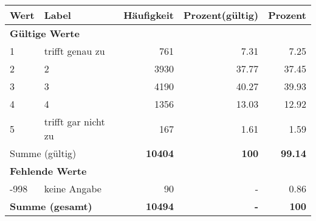      \begin{longtable}{lXrrr}
     \toprule
     \textbf{Wert} & \textbf{Label} & \textbf{Häufigkeit} & \textbf{Prozent(gültig)} & \textbf{Prozent} \\
     \endhead
     \midrule
     \multicolumn{5}{l}{\textbf{Gültige Werte}}\\

     1 &
     \multicolumn{1}{X}{ trifft genau zu   } &


       \num{761} &
       \num[round-mode=places,round-precision=2]{7,31} &
         \num[round-mode=places,round-precision=2]{7,25} \\

     2 &
     \multicolumn{1}{X}{ 2   } &


       \num{3930} &
       \num[round-mode=places,round-precision=2]{37,77} &
         \num[round-mode=places,round-precision=2]{37,45} \\

     3 &
     \multicolumn{1}{X}{ 3   } &


       \num{4190} &
       \num[round-mode=places,round-precision=2]{40,27} &
         \num[round-mode=places,round-precision=2]{39,93} \\

     4 &
     \multicolumn{1}{X}{ 4   } &


       \num{1356} &
       \num[round-mode=places,round-precision=2]{13,03} &
         \num[round-mode=places,round-precision=2]{12,92} \\

     5 &
     \multicolumn{1}{X}{ trifft gar nicht zu   } &


       \num{167} &
       \num[round-mode=places,round-precision=2]{1,61} &
         \num[round-mode=places,round-precision=2]{1,59} \\
     \midrule
     \multicolumn{2}{l}{Summe (gültig)} &
       \textbf{\num{10404}} &
     \textbf{100} &
       \textbf{\num[round-mode=places,round-precision=2]{99,14}} \\
     \multicolumn{5}{l}{\textbf{Fehlende Werte}}\\
       -998 &
       keine Angabe &
         \num{90} &
        - &
         \num[round-mode=places,round-precision=2]{0,86} \\
     \midrule
     \multicolumn{2}{l}{\textbf{Summe (gesamt)}} &
          \textbf{\num{10494}} &
        \textbf{-} &
        \textbf{100} \\
     \bottomrule
     \end{longtable}
     
